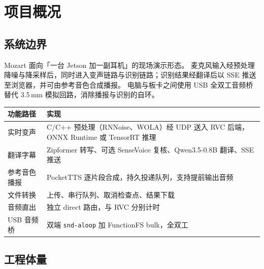 \documentclass[11pt,a4paper]{ctexart}
\newcommand{\code}[1]{\texttt{#1}}
\begin{document}
\section{项目概况}

\subsection{系统边界}

Mozart 面向「一台 Jetson 加一副耳机」的现场演示形态。
麦克风输入经预处理降噪与降采样后，同时进入变声链路与识别链路；识别结果经翻译后以 SSE 推送至浏览器，并可由参考音色合成播报。
电脑与板卡之间使用 USB 全双工音频桥替代 3.5\,mm 模拟回路，消除播报与识别的自环。

\begin{table}[H]\centering\small
\begin{tabularx}{\textwidth}{@{}lY@{}}
\toprule
功能路径 & 实现 \\
\midrule
实时变声 & C/C++ 预处理（RNNoise、WOLA）经 UDP 送入 RVC 后端，ONNX Runtime 或 TensorRT 推理 \\
翻译字幕 & Zipformer 转写、可选 SenseVoice 复核、Qwen3.5-0.8B 翻译、SSE 推送 \\
参考音色播报 & PocketTTS 逐片段合成，持久投递队列，支持提前输出音频 \\
文件转换 & 上传、串行队列、取消检查点、结果下载 \\
音频直出 & 独立 direct 路由，与 RVC 分别计时 \\
USB 音频桥 & 双端 \code{snd-aloop} 加 FunctionFS bulk，全双工 \\
\bottomrule
\end{tabularx}
\end{table}

\subsection{工程体量}
\end{document}
